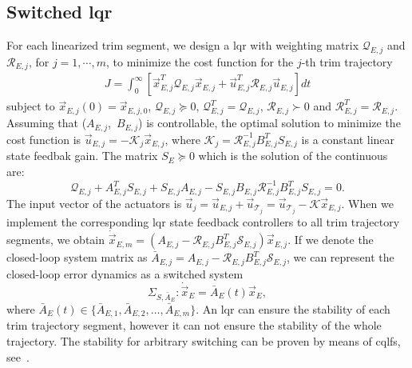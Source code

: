 \subsection{Switched \ac{lqr}}
For each linearized trim segment, we design a \acl{lqr}  with weighting matrix $ \mathcal{Q}_{E,j}$ and $\mathcal{R}_{E,j}$, for $j=1, \cdots, m$, to minimize the cost function for the $j$-th trim trajectory
\begin{align}
J=\int^{\infty}_{0}[\vec{x}_{E,j}^{T}\mathcal{Q}_{E,j}\vec{x}_{E,j}+\vec{u}_{E,j}^{T}\mathcal{R}_{E,j}
\vec{u}_{E,j}]dt
\end{align}
subject to $\vec{x}_{E,j}(0)=\vec{x}_{E,j,0}$, $\mathcal{Q}_{E,j} \succeq 0$, $\mathcal{Q}_{E,j}^{T}=\mathcal{Q}_{E,j}$, $\mathcal{R}_{E,j} \succ 0$ and $\mathcal{R}_{E,j}^{T}=\mathcal{R}_{E,j}$.
Assuming that ($A_{E,j}$,~$B_{E,j}$) is controllable, the optimal solution to minimize the cost function is $\vec{u}_{E,j}=-\mathcal{K}_{j}\vec{x}_{E,j}$,
where $\mathcal{K}_{j}=\mathcal{R}_{E,j}^{-1}B_{E,j}^{T}
S_{E,j}$ is a constant linear state feedbak gain. The matrix $S_{E}\succeq 0$  which is the solution of the continuous \ac{are}: 
\begin{equation}
\mathcal{Q}_{E,j}+A_{E,j}^{T}S_{E,j}
+S_{E,j}A_{E,j}
-S_{E,j}B_{E,j}\mathcal{R}_{E,j}^{-1}
B_{E,j}^{T}S_{E,j}=0.
\end{equation}
The input vector of the actuators is $\vec{u}_{j}=\vec{u}_{E,j}+\vec{u}_{\mathcal{T}_{j}}
=\vec{u}_{\mathcal{T}_{j}}-\mathcal{K}\vec{x}_{E,j}$.  
When we implement the corresponding \ac{lqr} state feedback controllers to all trim trajectory segments, we obtain $\dot{\vec{x}}_{E,m} =(A_{E,j}-
\mathcal{R}_{E,j}B^{T}_{E,j}
\mathcal{S}_{E,j})\vec{x}_{E,j}$.
If we denote the closed-loop system matrix as $
\bar{A}_{E,j}=A_{E,j}-
\mathcal{R}_{E,j}B^{T}_{E,j}
\mathcal{S}_{E,j}$, we can represent the closed-loop error dynamics as a switched system
\begin{equation}
\Sigma_{S,\bar{A}_{E}}:\dot{\vec{x}}_{E}=\bar{A}_{E}(t)\vec{x}_{E},
\end{equation}
where $\bar{A}_{E}(t)\in\lbrace \bar{A}_{E,1}, \bar{A}_{E,2}, \ldots,\bar{A}_{E,m}\rbrace$.
An \ac{lqr} can ensure the stability of each trim trajectory segment, however it can not ensure the stability of the whole trajectory. The stability for arbitrary switching can be proven by means of \acfp{cqlf}, see~\cite{c7}. 

